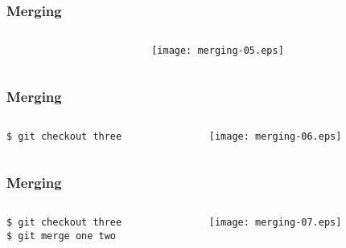 \documentclass[english]{beamer}
\newcommand{\CMD}[1]{%
\texttt{\textcolor{code-blue}{#1}}%
}
\newcommand{\cmd}[1]{%
\texttt{\textcolor{code-orange}{#1}}%
}
\begin{document}
\begin{frame}
\frametitle{Merging}

\begin{columns}[t]
        \begin{column}[T]{.5\textwidth}
        \end{column}
        \begin{column}[T]{.5\textwidth}
                \texttt{[image: merging-05.eps]}
        \end{column}
\end{columns}
\end{frame}

\begin{frame}
\frametitle{Merging}

\begin{columns}[t]
        \begin{column}[T]{.5\textwidth}
                {\small
                \CMD{\$ git checkout three} \\
                }
        \end{column}
        \begin{column}[T]{.5\textwidth}
                \texttt{[image: merging-06.eps]}
        \end{column}
\end{columns}
\end{frame}

\begin{frame}
\frametitle{Merging}

\begin{columns}[t]
        \begin{column}[T]{.5\textwidth}
                {\small
                \cmd{\$ git checkout three} \\
                \CMD{\$ git merge one two} \\
                }
        \end{column}
        \begin{column}[T]{.5\textwidth}
                \texttt{[image: merging-07.eps]}
        \end{column}
\end{columns}
\end{frame}
\end{document}
